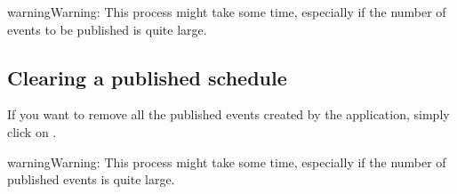 \documentclass[letterpaper,10pt,english]{sphinxmanual}
\begin{document}
\begin{figure}[H]
\centering
{}\end{figure}

\begin{sphinxadmonition}{warning}{Warning:}
This process might take some time, especially if the number of events
to be published is quite large.
\end{sphinxadmonition}


\subsection{Clearing a published schedule}
\label{\detokenize{index:clearing-a-published-schedule}}
If you want to remove all the published events created by the application,
simply click on .

\begin{figure}[H]
\centering
{}\end{figure}

\begin{sphinxadmonition}{warning}{Warning:}
This process might take some time, especially if the number of published
events is quite large.
\end{sphinxadmonition}



\renewcommand{\indexname}{Index}
\printindex
\end{document}
